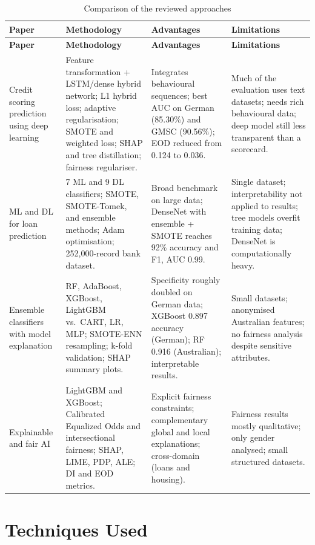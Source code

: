 \documentclass[12pt,a4paper,final]{extreport}
\begin{document}
{\renewcommand{\arraystretch}{1.35}
\setlength{\tabcolsep}{6pt}
\small
\begin{longtable}{|p{3.1cm}|p{3.65cm}|p{3.65cm}|p{3.65cm}|}
\caption{Comparison of the reviewed approaches}\label{tab:compare}\\
\hline
\textbf{Paper} & \textbf{Methodology} & \textbf{Advantages} & \textbf{Limitations} \\ \hline
\endfirsthead
\hline
\textbf{Paper} & \textbf{Methodology} & \textbf{Advantages} & \textbf{Limitations} \\ \hline
\endhead
\hline
\endfoot
\hline
\endlastfoot
Credit scoring prediction using deep learning \cite{p1} &
Feature transformation + LSTM/dense hybrid network; L1 hybrid loss; adaptive regularisation; SMOTE and weighted loss; SHAP and tree distillation; fairness regulariser. &
Integrates behavioural sequences; best AUC on German (85.30\%) and GMSC (90.56\%); EOD reduced from 0.124 to 0.036. &
Much of the evaluation uses text datasets; needs rich behavioural data; deep model still less transparent than a scorecard. \\ \hline
ML and DL for loan prediction \cite{p2} &
7 ML and 9 DL classifiers; SMOTE, SMOTE-Tomek, and ensemble methods; Adam optimisation; 252{,}000-record bank dataset. &
Broad benchmark on large data; DenseNet with ensemble + SMOTE reaches 92\% accuracy and F1, AUC 0.99. &
Single dataset; interpretability not applied to results; tree models overfit training data; DenseNet is computationally heavy. \\ \hline
Ensemble classifiers with model explanation \cite{p3} &
RF, AdaBoost, XGBoost, LightGBM vs.\ CART, LR, MLP; SMOTE-ENN resampling; k-fold validation; SHAP summary plots. &
Specificity roughly doubled on German data; XGBoost 0.897 accuracy (German); RF 0.916 (Australian); interpretable results. &
Small datasets; anonymised Australian features; no fairness analysis despite sensitive attributes. \\ \hline
Explainable and fair AI \cite{p4} &
LightGBM and XGBoost; Calibrated Equalized Odds and intersectional fairness; SHAP, LIME, PDP, ALE; DI and EOD metrics. &
Explicit fairness constraints; complementary global and local explanations; cross-domain (loans and housing). &
Fairness results mostly qualitative; only gender analysed; small structured datasets. \\
\end{longtable}}

\section{Techniques Used}
\end{document}
